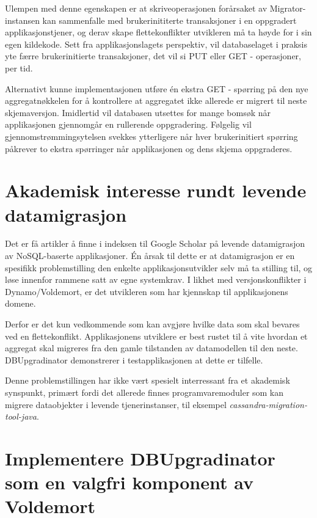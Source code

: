 Ulempen med denne egenskapen er at skriveoperasjonen forårsaket av Migrator-instansen kan sammenfalle med brukerinititerte transaksjoner i en oppgradert applikasjonstjener, og derav skape flettekonflikter utvikleren må ta høyde for i sin egen kildekode. Sett fra applikasjonslagets perspektiv, vil databaselaget i praksis yte færre brukerinitierte transaksjoner, det vil si PUT eller GET - operasjoner, per tid.

Alternativt kunne implementasjonen utføre én ekstra GET - spørring på den nye aggregatnøkkelen for å kontrollere at aggregatet ikke allerede er migrert til neste skjemaversjon. Imidlertid vil databasen utsettes for mange bomsøk når applikasjonen gjennomgår en rullerende oppgradering. Følgelig vil gjennomstrømmings\-ytelsen svekkes ytterligere når hver brukerinitiert spørring påkrever to ekstra spørringer når applikasjonen og dens skjema oppgraderes.

\section{Akademisk interesse rundt levende datamigrasjon}

Det er få artikler å finne i indeksen til Google Scholar på levende datamigrasjon av NoSQL-baserte applikasjoner. Én årsak til dette er at datamigrasjon er en spesifikk problemstilling den enkelte applikasjonsutvikler selv må ta stilling til, og løse innenfor rammene satt av egne systemkrav. I likhet med versjonskonflikter i Dynamo/Voldemort, er det utvikleren som har kjennskap til applikasjonens domene.

Derfor er det kun vedkommende som kan avgjøre hvilke data som skal bevares ved en flettekonflikt. Applikasjonens utviklere er best rustet til å vite hvordan et aggregat skal migreres fra den gamle tilstanden av datamodellen til den neste. DBUpgradinator demonstrerer i testapplikasjonen at dette er tilfelle.

Denne problemstillingen har ikke vært spesielt interressant fra et akademisk synspunkt, primært fordi det allerede finnes programvaremoduler som kan migrere dataobjekter i levende tjenerinstanser, til eksempel \emph{cassandra-migration-tool-java}.

\section{Implementere DBUpgradinator som en valgfri komponent av Voldemort} \label{integratewithvoldemort}

